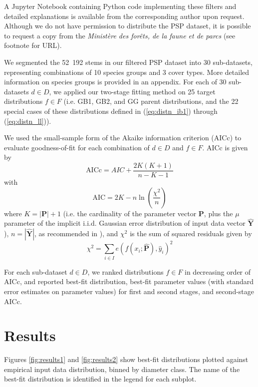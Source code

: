 \documentclass{article}
\begin{document}
A Jupyter Notebook containing Python code implementing these filters and detailed explanations is available from the corresponding author upon request.
Although we do not have permission to distribute the PSP dataset, it is possible to request a copy from the \emph{Ministère des forêts, de la faune et de parcs} (see footnote for URL).

We segmented the 52~192 stems in our filtered PSP dataset into 30 sub-datasets, representing combinations of 10 species groups and 3 cover types.
More detailed information on species groups is provided in an appendix. 
For each of 30 sub-datasets $d \in D$, we applied our two-stage fitting method on 25 target distributions $f \in F$ (i.e. GB1, GB2, and GG parent distributions, and the 22 special cases of these distributions defined in (\ref{eq:distn_ib1}) through (\ref{eq:distn_ll})).

We used the small-sample form of the Akaike information criterion (AICc) to evaluate goodness-of-fit for each combination of $d \in D$ and $f \in F$. AICc is given by
\begin{equation}
\text{AICc} = AIC + \frac{2K(K + 1)}{n - K - 1}
\end{equation}
with 
\begin{equation}
\text{AIC} = 2K - n\ln\left(\frac{\chi^2}{n}\right)
\end{equation}
where $K=|\mathbf{P}|+1$ (i.e. the cardinality of the parameter vector $\mathbf{P}$, plus the $\mu$ parameter of the implicit i.i.d. Gaussian error distribution of input data vector $\mathbf{\hat{Y}}$), $n=|\mathbf{\hat{Y}}|$, as recommended in \citealp{burnham2002model}), and $\chi^2$ is the sum of squared residuals given by
\begin{equation}
\chi^2 = \sum_{i \in I} e\left(f(x_i; \bm{\hat{P}}), \hat{y}_i\right)^2
\end{equation}

For each sub-dataset $d \in D$, we ranked distributions $f \in F$ in decreasing order of AICc, and reported best-fit distribution, best-fit parameter values (with standard error estimates on parameter values) for first and second stages, and second-stage AICc.

\section{Results}
\label{sec:results}

Figures \ref{fig:results1} and \ref{fig:results2} show best-fit distributions plotted against empirical input data distribution, binned by diameter class. The name of the best-fit distribution is identified in the legend for each subplot.
\end{document}
